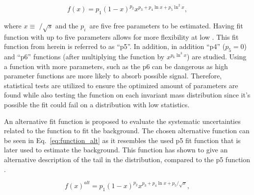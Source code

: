 \begin{equation}
    f(x) = p_1 (1 - x)^{p_2} x^{p_3 + p_4\ln x + p_5 \ln^2 x},
\label{eq:fit-function}
\tag{6.6}
\end{equation}

where $x \equiv $ \mjj$ /\sqrt{s}$ and the $p_i$\ are five free parameters to be estimated. Having fit function with up to five parameters allows for more flexibility at low \mjj. This fit function from herein 
is referred to as ``p5''. In addition, in addition ``p4'' ($p_5=0$) and ``p6'' functions (after multiplying the function by $x^{p_6 \ln^3 x}$) are studied. Using a function with more parameters, such
as the p6 can be dangerous as high parameter functions are more likely to absorb possible signal. Therefore, statistical tests are utilized to ensure the optimized amount of parameters are found while also 
testing the function on each invariant mass distribution since it's possible the fit could fail on a distribution with low statistics. 
\par
An alternative fit function is proposed to evaluate the systematic uncertainties related to the function to fit the background. The chosen alternative function can be seen in Eq.~\ref{eq:function_alt} as it resembles the used p5 fit 
function that is later used to estimate the background. This function has shown to give an alternative description of the tail in the \mjj distribution, compared to the p5 function \cite{alt-fit-hypo}. 

\begin{equation}
    f(x)^{alt} = p_1 (1 - x)^{p_2} x^{p_3 + p_4\ln x + p_5 /\sqrt{x}},
\label{eq:function_alt}
\tag{6.7}
\end{equation}

